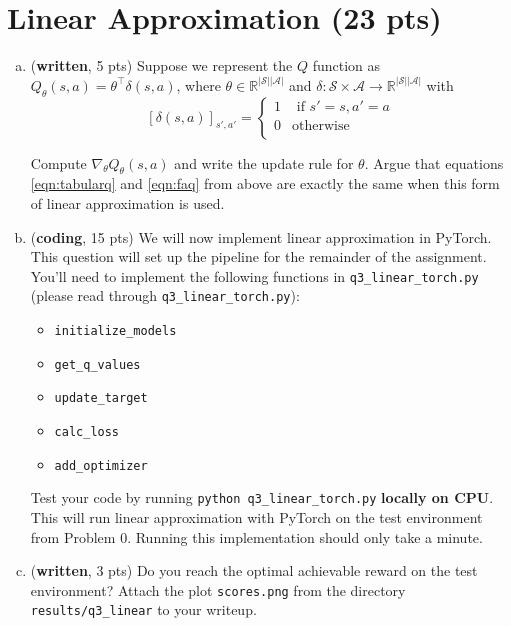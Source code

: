 \documentclass{article}
\newif\ifanswers
\newcommand{\ifans}[1]{\ifanswers \color{red} \textbf{Solution: } #1 \color{black} \else {} \fi}
\begin{document}
\section{Linear Approximation (23 pts)}
\begin{enumerate}[(a)]
\item (\textbf{written}, 5 pts) 
Suppose we represent the $Q$ function as
$Q_{\theta}(s, a) = \theta^\top \delta(s,a)$, where $\theta \in \mathbb{R}^{\vert\mathcal{S}\vert \vert \mathcal{A}\vert }$ and $\delta : \mathcal{S} \times \mathcal{A} \rightarrow \mathbb{R}^{|\mathcal{S}| |\mathcal{A}|}$ with
\[
    [\delta(s,a)]_{s',a'}=\left\{
                \begin{array}{ll}
                  1 & \text{ if } s'=s, a'=a\\
                  0 & \text{otherwise}\\
                \end{array}
              \right.
  \]
  
  Compute $\nabla_{\theta} Q_{\theta}(s, a)$ and write the update rule for $\theta$.
  Argue that equations \eqref{eqn:tabularq} and \eqref{eqn:faq} from above are exactly the same when this form of linear approximation is used.
  
 \ifans{
  }

 
\item (\textbf{coding}, 15 pts) We will now implement linear approximation in PyTorch. This question will set up the pipeline for the remainder of the assignment. You'll need to implement the following functions in \texttt{q3\_linear\_torch.py} (please read through \texttt{q3\_linear\_torch.py}):
\begin{itemize}
	\item \texttt{initialize\_models}
	\item \texttt{get\_q\_values}
	\item \texttt{update\_target}
	\item \texttt{calc\_loss}
	\item \texttt{add\_optimizer}
\end{itemize}
Test your code by running \texttt{python q3\_linear\_torch.py} \textbf{locally on CPU}.  This will run linear approximation with PyTorch on the test environment from Problem 0.  Running this implementation should only take a minute.

\item (\textbf{written}, 3 pts) Do you reach the optimal achievable reward on the test environment? Attach the plot \texttt{scores.png} from the directory \texttt{results/q3\_linear} to your writeup.
 
 \ifans{
}

\end{enumerate}
\end{document}
